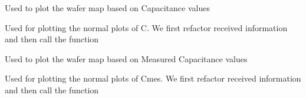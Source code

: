 \documentclass[letterpaper,10pt,english]{sphinxmanual}
\begin{document}
\begin{fulllineitems}
\label{\detokenize{app:app.C_WM}}
\pysigstartsignatures
{}
\pysigstopsignatures
\sphinxAtStartPar
Used to plot the wafer map based on Capacitance values

\end{fulllineitems}


\begin{fulllineitems}
\label{\detokenize{app:app.C_normal}}
\pysigstartsignatures
{}
\pysigstopsignatures
\sphinxAtStartPar
Used for plotting the normal plots of C.
We first refactor received information and then call the function

\end{fulllineitems}


\begin{fulllineitems}
\label{\detokenize{app:app.Cmes_WM}}
\pysigstartsignatures
{}
\pysigstopsignatures
\sphinxAtStartPar
Used to plot the wafer map based on Measured Capacitance values

\end{fulllineitems}


\begin{fulllineitems}
\label{\detokenize{app:app.Cmes_normal}}
\pysigstartsignatures
{}
\pysigstopsignatures
\sphinxAtStartPar
Used for plotting the normal plots of Cmes.
We first refactor received information and then call the function

\end{fulllineitems}
\end{document}

